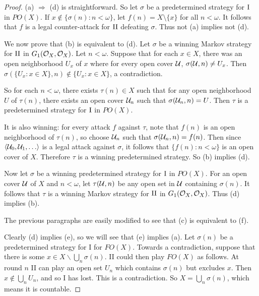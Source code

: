 \documentclass{amsart}
\theoremstyle{plain}
\theoremstyle{definition}
\theoremstyle{remark}
\theoremstyle{plain}
\theoremstyle{definition}
\theoremstyle{remark}
\begin{document}
\begin{proof}
 (a) \(\Rightarrow\) (d) is straightforward. 
 So let \(\sigma\) be a predetermined strategy for \(\mathrm{I}\) in \(PO(X)\). 
 If \(x\not\in\{\sigma(n):n<\omega\}\), let \(f(n)=X\setminus\{x\}\) for all \(n<\omega\). It follows that \(f\) is a legal counter-attack for \(\mathrm{II}\) defeating \(\sigma\). 
 Thus not (a) implies not (d).

 We now prove that (b) is equivalent to (d).
 Let \(\sigma\) be a winning Markov strategy for \(\mathrm{II}\) in \(G_1(\mathcal{O}_{X},\mathcal{O}_{X})\).
 Let \(n<\omega\). Suppose that for each \(x\in X\), there was an open neighborhood \(U_x\) of \(x\) where for every open cover \(\mathcal{U}\), \(\sigma(\mathcal{U},n)\not=U_x\). 
 Then \(\sigma(\{U_x : x\in X\},n)\not\in\{U_x:x\in X\}\), a contradiction.

 So for each \(n<\omega\), there exists \(\tau(n)\in X\) such that for any open neighborhood \(U\) of \(\tau(n)\), there exists an open cover \(\mathcal{U}_n\) such that \(\sigma(\mathcal{U}_n,n)=U\). 
 Then \(\tau\) is a predetermined strategy for \(\mathrm{I}\) in \(PO(X)\).

 It is also winning: for every attack \(f\) against \(\tau\), note that \(f(n)\) is an open neighborhood of \(\tau(n)\), so choose \(\mathcal{U}_n\) such that \(\sigma(\mathcal{U}_n,n)=f(n)\). 
 Then since \(\<\mc U_0,\mc U_1,\dots\>\) is a legal attack against \(\sigma\), it follows that \(\{f(n):n<\omega\}\) is an open cover of \(X\). 
 Therefore \(\tau\) is a winning predetermined strategy.
 So (b) implies (d).

 Now let \(\sigma\) be a winning predetermined strategy for \(\mathrm{I}\) in \(PO(X)\). 
 For an open cover \(\mathcal{U}\) of \(X\) and \(n<\omega\), let \(\tau(\mathcal{U},n)\) be any open set in \(\mathcal{U}\) containing \(\sigma(n)\). 
 It follows that \(\tau\) is a winning Markov strategy for \(\mathrm{II}\) in \(G_1(\mathcal{O}_{X},\mathcal{O}_{X})\).
 Thus (d) implies (b).
 
 The previous paragraphs are easily modified to see that (c) is equivalent to (f).

 Clearly (d) implies (e), so we will see that (e) implies (a). 
 Let \(\sigma(n)\) be a predetermined strategy for I for \(FO(X)\). 
 Towards a contradiction, suppose that there is some \(x \in X \smallsetminus \bigcup_n \sigma(n)\).
 II could then play \(FO(X)\) as follows.
 At round \(n\) II can play an open set \(U_n\) which contains \(\sigma(n)\) but excludes \(x\).
 Then \(x \notin \bigcup_n U_n\), and so I has lost.
 This is a contradiction.
 So \(X = \bigcup_n \sigma(n)\), which means it is countable.


\end{proof}
\end{document}
